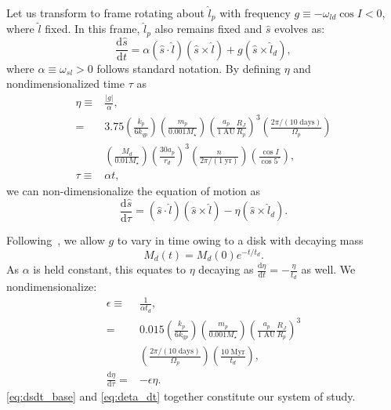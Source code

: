 \documentclass[
        fleqn,
        usenatbib,
    ]{mnras}
\newcommand*{\rd}[2]{\frac{\mathrm{d}#1}{\mathrm{d}#2}}
\newcommand*{\abs}[1]{\left|#1\right|}
\newcommand*{\p}[1]{\left(#1\right)}
\begin{document}
Let us transform to frame rotating about $\hat{l}_p$ with frequency $g \equiv
-\omega_{ld}\cos I < 0$, where $\hat{l}$ fixed. In this frame, $\hat{l}_p$
also remains fixed and $\hat{s}$ evolves as:
\begin{equation}
    \rd{\hat{s}}{t} = \alpha \p{\hat{s} \cdot \hat{l}}
            \p{\hat{s} \times \hat{l}}
        + g\p{\hat{s} \times \hat{l}_d},
\end{equation}
where $\alpha \equiv \omega_{sl} > 0$ follows standard notation. By defining
$\eta$ and nondimensionalized time $\tau$ as
\begin{align}
    \eta \equiv{}& \frac{\abs{g}}{\alpha}\label{eq:eta},\\
        ={}& 3.75 \p{\frac{k_p}{6k_{qp}}}
            \p{\frac{m_p}{0.001 M_\star}}
            \p{\frac{a_p}{1\;\mathrm{AU}}\frac{R_J}{R_p}}^3
            \p{\frac{2\pi/\p{10\;\mathrm{days}}}{\Omega_p}}\nonumber\\
        &\p{\frac{M_d}{0.01 M_{\star}}}
            \p{\frac{30 a_p}{r_d}}^3
            \p{\frac{n}{2\pi / \p{1\;\mathrm{yr}}}}
            \p{\frac{\cos I}{\cos 5^\circ}},\nonumber\\
    \tau \equiv{}& \alpha t,
\end{align}
we can non-dimensionalize the equation of motion as
\begin{equation}
    \rd{\hat{s}}{\tau} = \p{\hat{s} \cdot \hat{l}}
            \p{\hat{s} \times \hat{l}}
        - \eta\p{\hat{s} \times \hat{l}_d}. \label{eq:dsdt_base}
\end{equation}

Following~\cite{millholland_disk}, we allow $g$ to vary in time owing to a
disk with decaying mass
\begin{equation}
    M_d(t) = M_d(0)e^{-t/t_d}.
\end{equation}
As $\alpha$ is held constant, this equates to $\eta$ decaying as $\rd{\eta}{t} =
-\frac{\eta}{t_d}$ as well. We nondimensionalize:
\begin{align}
    \epsilon \equiv{}& \frac{1}{\alpha t_d},\\
        ={}& 0.015 \p{\frac{k_p}{6k_{qp}}}
            \p{\frac{m_p}{0.001 M_\star}}
            \p{\frac{a_p}{1\;\mathrm{AU}}\frac{R_J}{R_p}}^3\nonumber\\
        &\p{\frac{2\pi/\p{10\;\mathrm{days}}}{\Omega_p}}
            \p{\frac{10\;\mathrm{Myr}}{t_d}},\\
    \rd{\eta}{\tau} ={}& -\epsilon \eta.\label{eq:deta_dt}
\end{align}
\autoref{eq:dsdt_base} and \autoref{eq:deta_dt} together constitute our system
of study.
\end{document}
